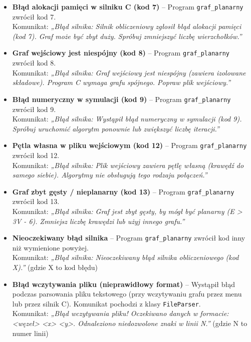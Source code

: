 \documentclass[a4paper, 11pt]{article}
\begin{document}
\begin{itemize}
  \item \textbf{Błąd alokacji pamięci w silniku C (kod 7)} – Program \texttt{graf\_planarny} zwrócił kod 7.\\
  Komunikat: \textit{„Błąd silnika: Silnik obliczeniowy zgłosił błąd alokacji pamięci (kod 7). Graf może być zbyt duży. Spróbuj zmniejszyć liczbę wierzchołków.”}

  \item \textbf{Graf wejściowy jest niespójny (kod 8)} – Program \texttt{graf\_planarny} zwrócił kod 8.\\
  Komunikat: \textit{„Błąd silnika: Graf wejściowy jest niespójny (zawiera izolowane składowe). Program C wymaga grafu spójnego. Popraw plik wejściowy.”}

  \item \textbf{Błąd numeryczny w symulacji (kod 9)} – Program \texttt{graf\_planarny} zwrócił kod 9.\\
  Komunikat: \textit{„Błąd silnika: Wystąpił błąd numeryczny w symulacji (kod 9). Spróbuj uruchomić algorytm ponownie lub zwiększyć liczbę iteracji.”}

  \item \textbf{Pętla własna w pliku wejściowym (kod 12)} – Program \texttt{graf\_planarny} zwrócił kod 12.\\
  Komunikat: \textit{„Błąd silnika: Plik wejściowy zawiera pętlę własną (krawędź do samego siebie). Algorytmy nie obsługują tego rodzaju połączeń.”}

  \item \textbf{Graf zbyt gęsty / nieplanarny (kod 13)} – Program \texttt{graf\_planarny} zwrócił kod 13.\\
  Komunikat: \textit{„Błąd silnika: Graf jest zbyt gęsty, by mógł być planarny (E > 3V - 6). Zmniejsz liczbę krawędzi lub użyj innego grafu.”}

  \item \textbf{Nieoczekiwany błąd silnika} – Program \texttt{graf\_planarny} zwrócił kod inny niż wymienione powyżej.\\
  Komunikat: \textit{„Błąd silnika: Nieoczekiwany błąd silnika obliczeniowego (kod X).”} (gdzie X to kod błędu)

  \item \textbf{Błąd wczytywania pliku (nieprawidłowy format)} – Wystąpił błąd podczas parsowania pliku tekstowego (przy wczytywaniu grafu przez menu lub przez silnik C). Komunikat pochodzi z klasy \texttt{FileParser}.\\
  Komunikat: \textit{„Błąd wczytywania pliku! Oczekiwano danych w formacie: <węzeł> <x> <y>. Odnaleziono niedozwolone znaki w linii N.”} (gdzie N to numer linii)


\end{itemize}
\end{document}
